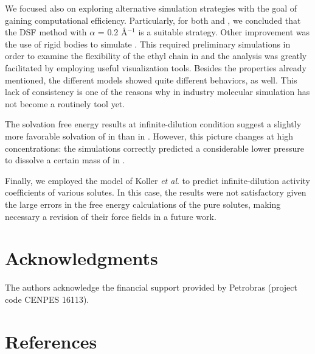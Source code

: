\documentclass[3p,twocolumn]{elsarticle}
\begin{document}
We focused also on exploring alternative simulation strategies with the goal of gaining computational efficiency.
Particularly, for both \ce{[emim][B(CN)_4]} and \ce{[emim][NTf_2]}, we concluded that the DSF method with $\alpha$ = 0.2 {\AA}$^{-1}$ is a suitable strategy.
Other improvement was the use of rigid bodies to simulate \ce{[emim][B(CN)_4]}.
This required preliminary simulations in order to examine the flexibility of the ethyl chain in \ce{[emim]^+} and the analysis was greatly facilitated by employing useful visualization tools.
Besides the properties already mentioned, the different models showed quite different behaviors, as well.
This lack of consistency is one of the reasons why in industry molecular simulation has not become a routinely tool yet.

The solvation free energy results at infinite-dilution condition suggest a slightly more favorable solvation of  in \ce{[emim][B(CN)_4]} than in  \ce{[emim][NTf_2]}.
However, this picture changes at high concentrations: the simulations correctly predicted a considerable lower pressure to dissolve a certain mass of  in \ce{[emim][B(CN)_4]}.

Finally, we employed the model of Koller \textit{et al}. \cite{Koller_2012} to predict infinite-dilution activity coefficients of various solutes.
In this case, the results were not satisfactory given the large errors in the free energy calculations of the pure solutes, making necessary a revision of their force fields in a future work.

\section*{Acknowledgments}
The authors acknowledge the financial support provided by Petrobras (project code CENPES 16113). 

\section*{References}


\end{document}
